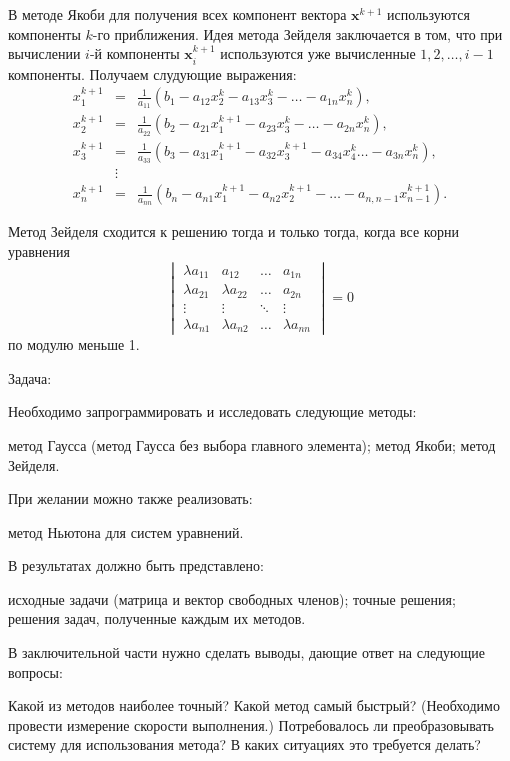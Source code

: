 В методе Якоби для получения всех компонент вектора $\mathbf{x}^{k+1}$
используются компоненты $k$-го приближения. Идея метода Зейделя заключается
в том, что при вычислении $i$-й компоненты $\mathbf{x}_{i}^{k+1}$
используются уже вычисленные $1,2,\ldots,i-1$ компоненты. Получаем
слудующие выражения:
\begin{eqnarray*}
x_{1}^{k+1} & = & \frac{1}{a_{11}}\left(b_{1}-a_{12}x_{2}^{k}-a_{13}x_{3}^{k}-\ldots-a_{1n}x_{n}^{k}\right),\\
x_{2}^{k+1} & = & \frac{1}{a_{22}}\left(b_{2}-a_{21}x_{1}^{k+1}-a_{23}x_{3}^{k}-\ldots-a_{2n}x_{n}^{k}\right),\\
x_{3}^{k+1} & = & \frac{1}{a_{33}}\left(b_{3}-a_{31}x_{1}^{k+1}-a_{32}x_{3}^{k+1}-a_{34}x_{4}^{k}\ldots-a_{3n}x_{n}^{k}\right),\\
 & \vdots\\
x_{n}^{k+1} & = & \frac{1}{a_{nn}}\left(b_{n}-a_{n1}x_{1}^{k+1}-a_{n2}x_{2}^{k+1}-\ldots-a_{n,n-1}x_{n-1}^{k+1}\right).
\end{eqnarray*}

\begin{thm}
Метод Зейделя сходится к решению тогда и только тогда, когда все корни
уравнения \textup{
\[
\begin{vmatrix}\lambda a_{11} & a_{12} & \ldots & a_{1n}\\
\lambda a_{21} & \lambda a_{22} & \ldots & a_{2n}\\
\vdots & \vdots & \ddots & \vdots\\
\lambda a_{n1} & \lambda a_{n2} & \ldots & \lambda a_{nn}
\end{vmatrix}=0
\]
}по модулю меньше 1.
\end{thm}
Задача:

Необходимо запрограммировать и исследовать следующие методы:

метод Гаусса (метод Гаусса без выбора главного элемента); метод Якоби;
метод Зейделя.

При желании можно также реализовать:

метод Ньютона для систем уравнений.

В результатах должно быть представлено:

исходные задачи (матрица и вектор свободных членов); точные решения;
решения задач, полученные каждым их методов.

В заключительной части нужно сделать выводы, дающие ответ на следующие
вопросы:

Какой из методов наиболее точный? Какой метод самый быстрый? (Необходимо
провести измерение скорости выполнения.) Потребовалось ли преобразовывать
систему для использования метода? В каких ситуациях это требуется
делать?

